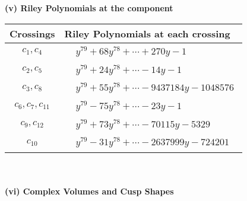 \documentclass[1p]{elsarticle_modified}
\theoremstyle{definition}
\begin{document}
\newpage\renewcommand{\arraystretch}{1}
\flushleft \textbf{(v) Riley Polynomials at the component}\newline \\
\begin{tabular}{m{50pt}|m{274pt}}
Crossings & \hspace{64pt}Riley Polynomials at each crossing \\
\hline $$\begin{aligned}c_{1},c_{4}\end{aligned}$$&$\begin{aligned}
&y^{79}+68 y^{78}+\cdots+270 y-1
\end{aligned}$\\
\hline $$\begin{aligned}c_{2},c_{5}\end{aligned}$$&$\begin{aligned}
&y^{79}+24 y^{78}+\cdots-14 y-1
\end{aligned}$\\
\hline $$\begin{aligned}c_{3},c_{8}\end{aligned}$$&$\begin{aligned}
&y^{79}+55 y^{78}+\cdots-9437184 y-1048576
\end{aligned}$\\
\hline $$\begin{aligned}c_{6},c_{7},c_{11}\end{aligned}$$&$\begin{aligned}
&y^{79}-75 y^{78}+\cdots-23 y-1
\end{aligned}$\\
\hline $$\begin{aligned}c_{9},c_{12}\end{aligned}$$&$\begin{aligned}
&y^{79}+73 y^{78}+\cdots-70115 y-5329
\end{aligned}$\\
\hline $$\begin{aligned}c_{10}\end{aligned}$$&$\begin{aligned}
&y^{79}-31 y^{78}+\cdots-2637999 y-724201
\end{aligned}$\\
\hline
\end{tabular}\\~\\
\newpage\flushleft \textbf{(vi) Complex Volumes and Cusp Shapes}
\end{document}
